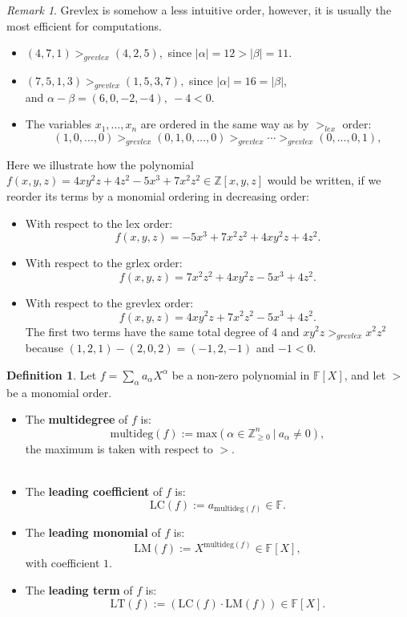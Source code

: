 \documentclass[thesis=M,english]{FITthesis}[2012/10/20]
\theoremstyle{remark}
\newtheorem*{RM}{Remark}
\theoremstyle{definition}
\newtheorem{DF}{Definition}[section]
\begin{document}
\begin{RM}
Grevlex is somehow a less intuitive order, however, it is usually the most efficient for computations.
\end{RM}
\begin{itemize}
\item $(4,7,1) >_{grevlex} (4, 2,5),$ since $|\alpha| = 12 > |\beta| = 11$.
\item $  (7, 5, 1, 3) >_{grevlex} (1,5,3,7),$ since $|\alpha| = 16 = |\beta|$, \\
and $\alpha - \beta = (6,0,-2, -4),\ -4 < 0$.
\item The variables $x_1,\ldots,x_n$ are ordered in the same way as by $>_{lex}$ order:
$$
(1,0,\ldots,0) >_{grevlex} (0,1,0,\ldots, 0) >_{grevlex} \cdots >_{grevlex} (0, \ldots, 0, 1),
$$
\end{itemize}
Here we illustrate how the polynomial $f(x,y,z) = 4xy^2z + 4z^2 - 5x^3 + 7x^2z^2 \in \mathbb{Z}[x,y,z]$ would be written, if we reorder its terms by a monomial ordering in decreasing order:
\begin{itemize}
\item With respect to the lex order:
$$
f(x,y,z) = -5x^3 + 7x^2z^2 + 4xy^2z + 4z^2.
$$
\item With respect to the grlex order:
$$
f(x,y,z) = 7x^2z^2  + 4xy^2z -5x^3 + 4z^2.
$$
\item With respect to the grevlex order:
$$
f(x,y,z) = 4xy^2z + 7x^2z^2  -5x^3 + 4z^2.
$$
The first two terms have the same total degree of $4$ and $xy^2z >_{grevlex} x^2z^2$ because $(1,2,1) - (2,0,2) = (-1,2,-1)$ and $-1 < 0$.
\end{itemize} 
\begin{DF}
Let $f = \sum_\alpha a_\alpha X^\alpha$ be a non-zero polynomial in $\mathbb{F}[X]$, and let $>$ be a monomial order.
\begin{itemize}
\item The \textbf{multidegree} of $f$ is:
$$
\text{multideg}(f) := \text{max}(\alpha \in \mathbb{Z}_{\geq 0}^n\ |\ a_\alpha \neq 0),
$$
the maximum is taken with respect to $>$.\\ \\
\item The \textbf{leading coefficient} of $f$ is:
$$
\text{LC}(f) := a_{\text{multideg}(f)} \in \mathbb{F}.
$$
\item The \textbf{leading monomial} of $f$ is:
$$
\text{LM}(f) := X^{\text{multideg}(f)} \in \mathbb{F}[X],
$$
with coefficient $1$.
\item The \textbf{leading term} of $f$ is:
$$
\text{LT}(f) := (\text{LC}(f)\cdot \text{LM}(f)) \in \mathbb{F}[X].
$$
\end{itemize}
\end{DF}
\end{document}

